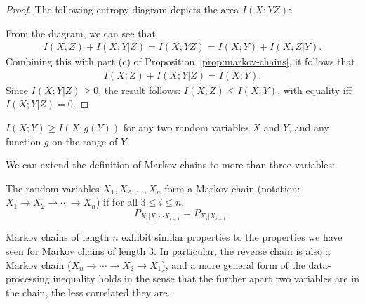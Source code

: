\begin{proof}
The following entropy diagram depicts the area $I(X;YZ)$:

\begin{center}
\end{center}

\noindent From the diagram, we can see that
\begin{align}
I(X;Z) + I(X;Y|Z) = I(X;YZ) = I(X;Y) + I(X;Z|Y).
\end{align}
Combining this with part (c) of Proposition~\ref{prop:markov-chains}, it follows that
\begin{align}
I(X;Z) + I(X;Y|Z) = I(X;Y).
\end{align}
Since $I(X;Y|Z) \geq 0$, the result follows: $I(X;Z) \leq I(X;Y)$, with equality iff $I(X;Y|Z) = 0$.
\end{proof}

\begin{corollary}
$I(X;Y) \geq I(X;g(Y))$ for any two random variables $X$ and $Y$, and any function $g$ on the range of $Y$.
\end{corollary}

We can extend the definition of Markov chains to more than three variables:
\begin{definition}
The random variables $X_1, X_2, \dots, X_n$ form a Markov chain (notation: $X_1 \to X_2 \to \cdots \to X_n$) if for all $3 \leq i \leq n$,
\[
P_{X_i|X_1 \cdots X_{i-1}} = P_{X_i|X_{i-1}}\, .
\]
\end{definition}
Markov chains of length $n$ exhibit similar properties to the properties we have seen for Markov chains of length 3. In particular, the reverse chain is also a Markov chain ($X_n \to \cdots \to X_2 \to X_1$), and a more general form of the data-processing inequality holds in the sense that the further apart two variables are in the chain, the less correlated they are.

